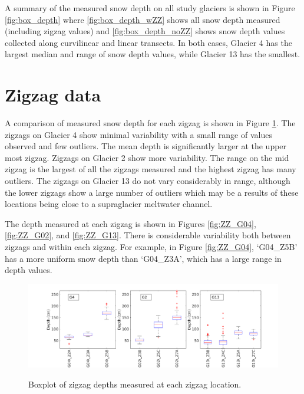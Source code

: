 \documentclass[12pt]{article}
\begin{document}
A summary of the measured snow depth on all study glaciers is shown in Figure \ref{fig:box_depth} where \ref{fig:box_depth_wZZ} shows all snow depth measured (including zigzag values) and \ref{fig:box_depth_noZZ} shows snow depth values collected along curvilinear and linear transects. In both cases, Glacier 4 has the largest median and range of snow depth values, while Glacier 13 has the smallest. 

\pagebreak
\section{Zigzag data}

A comparison of measured snow depth for each zigzag is shown in Figure \ref{fig:ZZ_boxplot}. The zigzags on Glacier 4 show minimal variability with a small range of values observed and few outliers. The mean depth is significantly larger at the upper most zigzag. Zigzags on Glacier 2 show more variability. The range on the mid zigzag is the largest of all the zigzags measured and the highest zigzag has many outliers. The zigzags on Glacier 13 do not vary considerably in range, although the lower zigzags show a large number of outliers which may be a results of these locations being close to a supraglacier meltwater channel. 

The depth measured at each zigzag is shown in Figures \ref{fig:ZZ_G04}, \ref{fig:ZZ_G02}, and \ref{fig:ZZ_G13}. There is considerable variability both between zigzags and within each zigzag. For example, in Figure \ref{fig:ZZ_G04}, `G04\_Z5B' has a more uniform snow depth than `G04\_Z3A', which has a large range in depth values. 
{
\begin{figure} 
	\centering
	\includegraphics[width = 1.1\textwidth]{Zigzag_Boxplot.png}\\
	\caption{Boxplot of zigzag depths measured at each zigzag location.}
	\label{fig:ZZ_boxplot}
\end{figure}
}
\end{document}
